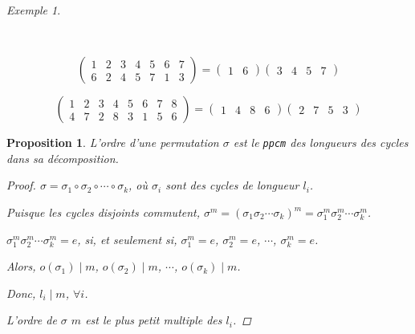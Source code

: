 \documentclass{report}
\newtheorem*{prop}{Proposition}
\theoremstyle{definition}
\theoremstyle{remark}
\newtheorem*{exem}{Exemple}
\begin{document}
	\begin{exem}
		\begin{ulist}~

			\item \[
			\begin{pmatrix}
				1&2&3&4&5&6&7\\
				6&2&4&5&7&1&3
			\end{pmatrix} = \begin{pmatrix}
				1&6
			\end{pmatrix} \begin{pmatrix}
				3&4&5&7
			\end{pmatrix}
			\]
			\item \[
			\begin{pmatrix}
				1&2&3&4&5&6&7&8\\
				4&7&2&8&3&1&5&6
			\end{pmatrix} = \begin{pmatrix}
				1&4&8&6
			\end{pmatrix} \begin{pmatrix}
				2&7&5&3
			\end{pmatrix}
			\]
		\end{ulist}
	\end{exem}
	\begin{prop}
		L'ordre d'une permutation $\sigma$ est le \verb|ppcm| des longueurs des cycles dans sa d\'ecomposition.
		\begin{proof}
			$\sigma = \sigma_1 \circ \sigma_2 \circ \dotsb \circ \sigma_k$, o\`u $\sigma_i$ sont des cycles de longueur $l_i$.

			Puisque les cycles disjoints commutent, $\sigma^m = (\sigma_1 \sigma_2 \dotsb \sigma_k)^m = \sigma_1^m \sigma_2^m \dotsb \sigma_k^m$.

			$\sigma_1^m \sigma_2^m \dotsb \sigma_k^m = e$, si, et seulement si, $\sigma_1^m=e$, $\sigma_2^m=e$, $\dotsb$, $\sigma_k^m=e$.

			Alors, $o(\sigma_1) \mid m$, $o(\sigma_2) \mid m$, $\dotsb$, $o(\sigma_k) \mid m$.

			Donc, $l_i \mid m$, $\forall i$.

			L'ordre de $\sigma$ $m$ est le plus petit multiple des $l_i$.
		\end{proof}
	\end{prop}
\end{document}
